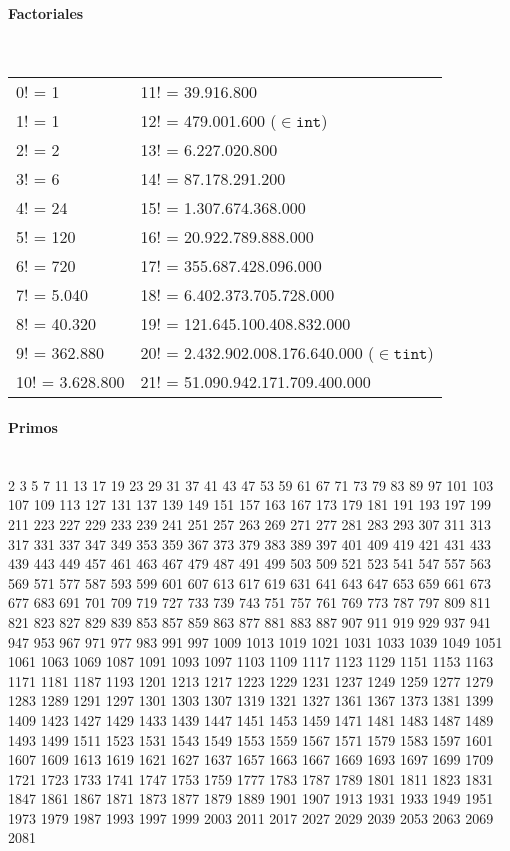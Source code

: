 \paragraph{Factoriales} \ \\
\begin{tabular}{l|l}
0! =	1             & 11! = 39.916.800  \\
1! =	1             & 12! =	479.001.600	($\in \mathtt{int}$)\\
2! =	2             & 13! =	6.227.020.800	\\
3! =	6             & 14! =	87.178.291.200	\\
4! =	24            & 15! =	1.307.674.368.000	\\
5! =	120   			  & 16! =	20.922.789.888.000	\\
6! =	720           & 17! =	355.687.428.096.000	\\
7! =	5.040	        & 18! =	6.402.373.705.728.000	\\
8! =	40.320	      & 19! =	121.645.100.408.832.000	\\
9! =	362.880       & 20! =	2.432.902.008.176.640.000	($\in \mathtt{tint}$) \\
10! =	3.628.800     & 21! =	51.090.942.171.709.400.000
\end{tabular}

\paragraph{Primos} \ \\
2 3 5 7 11 13 17 19 23 29
31 37 41 43 47 53 59 61 67 71
73 79 83 89 97 101 103 107 109 113
127 131 137 139 149 151 157 163 167 173
179 181 191 193 197 199 211 223 227 229
233 239 241 251 257 263 269 271 277 281
283 293 307 311 313 317 331 337 347 349
353 359 367 373 379 383 389 397 401 409
419 421 431 433 439 443 449 457 461 463
467 479 487 491 499 503 509 521 523 541
547 557 563 569 571 577 587 593 599 601
607 613 617 619 631 641 643 647 653 659
661 673 677 683 691 701 709 719 727 733
739 743 751 757 761 769 773 787 797 809
811 821 823 827 829 839 853 857 859 863
877 881 883 887 907 911 919 929 937 941
947 953 967 971 977 983 991 997 1009 1013
1019 1021 1031 1033 1039 1049 1051 1061 1063 1069
1087 1091 1093 1097 1103 1109 1117 1123 1129 1151
1153 1163 1171 1181 1187 1193 1201 1213 1217 1223
1229 1231 1237 1249 1259 1277 1279 1283 1289 1291
1297 1301 1303 1307 1319 1321 1327 1361 1367 1373
1381 1399 1409 1423 1427 1429 1433 1439 1447 1451
1453 1459 1471 1481 1483 1487 1489 1493 1499 1511
1523 1531 1543 1549 1553 1559 1567 1571 1579 1583
1597 1601 1607 1609 1613 1619 1621 1627 1637 1657
1663 1667 1669 1693 1697 1699 1709 1721 1723 1733
1741 1747 1753 1759 1777 1783 1787 1789 1801 1811
1823 1831 1847 1861 1867 1871 1873 1877 1879 1889
1901 1907 1913 1931 1933 1949 1951 1973 1979 1987
1993 1997 1999 2003 2011 2017 2027 2029 2039 2053
2063 2069 2081
\newpage
